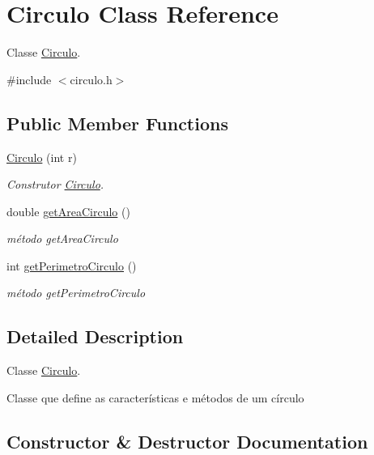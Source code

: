 \hypertarget{classCirculo}{}\section{Circulo Class Reference}
\label{classCirculo}


Classe \hyperlink{classCirculo}{Circulo}.  




{\ttfamily \#include $<$circulo.\+h$>$}

\subsection*{Public Member Functions}
\begin{DoxyCompactItemize}
\item 
\hyperlink{classCirculo_ade132c01b947abd67ae529f1c54f3e2d}{Circulo} (int r)
\begin{DoxyCompactList}\small\item\em Construtor \hyperlink{classCirculo}{Circulo}. \end{DoxyCompactList}\item 
double \hyperlink{classCirculo_a22aa943a6aab8f67b7aad2c9a586dd2c}{get\+Area\+Circulo} ()
\begin{DoxyCompactList}\small\item\em método get\+Area\+Circulo \end{DoxyCompactList}\item 
int \hyperlink{classCirculo_aea21484f413ddec2d6e2aa3914f01e1d}{get\+Perimetro\+Circulo} ()
\begin{DoxyCompactList}\small\item\em método get\+Perimetro\+Circulo \end{DoxyCompactList}\end{DoxyCompactItemize}


\subsection{Detailed Description}
Classe \hyperlink{classCirculo}{Circulo}. 

Classe que define as características e métodos de um círculo 

\subsection{Constructor \& Destructor Documentation}
